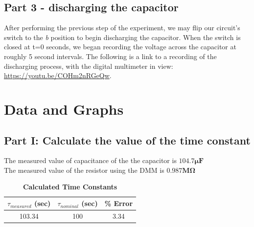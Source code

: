 \documentclass[titlepage]{article}
\begin{document}
    \subsection{Part 3 - discharging the capacitor}
    After performing the previous step of the experiment, we may flip our circuit's switch to the \emph{b} position to begin discharging the capacitor. When the switch is closed at t=0 seconds, we began recording the voltage across the capacitor at roughly 5 second intervals. 
    The following is a link to a recording of the discharging process, with the digital multimeter in view: \url{https://youtu.be/COHm2nRGeQw}.



\newpage
	\section{Data and Graphs}
	\subsection{Part I: Calculate the value of the time constant}
		The measured value of capacitance of the the capacitor is
		\(\mathbf{ 104.7\pmb{\mu} F }\) \\
		The measured value of the resistor using the DMM is
	\(\pmb{0.987 M\Omega} \)
		\begin{table}[ht!]
			\caption*{\textbf{Calculated Time Constants}}
			\centering
			\begin{tabular}{c|c|c}
				$\tau_{measured}$ (sec) & $\tau_{nominal}$ (sec) & \% Error \\
				\hline
				103.34 & 100 & 3.34
			\end{tabular}
		\end{table}
\end{document}
